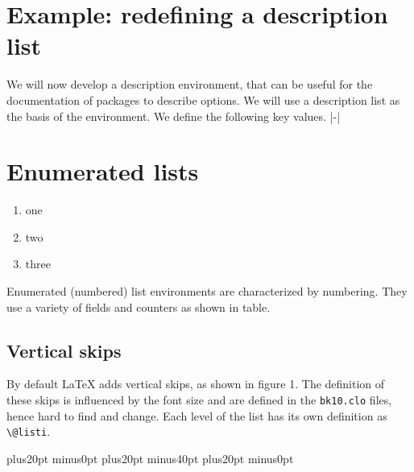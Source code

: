 \section{Example: redefining a description list}
We will now develop a description environment, that can be useful for the documentation of packages to describe options. We will use a description list as the basis of the environment. We define the following key values.
|\itemindent-\leftmargin|

\section{Enumerated lists}


\begin{enumerate}
\item one
\item two
\item three
\end{enumerate}

Enumerated (numbered) list environments are characterized by numbering. They use a variety of fields and counters as shown in table.

\subsection{Vertical skips}

By default LaTeX adds vertical skips, as shown in figure 1. The definition of these skips is influenced by the font size and are defined in the \texttt{bk10.clo} files, hence hard to find and change. Each level of the list has its own definition as \lstinline{\@listi}.

\bigskip
{}

\begin{teXXX}
\def\@listi{\leftmargin\leftmargini
            \parsep 40pt plus20pt minus0pt
            \topsep 80pt plus20pt minus40pt
            \itemsep40pt plus20pt minus0pt}
\let\@listI\@listi
\@listi

\def\@listii {\leftmargin\leftmarginii
              \labelwidth\leftmarginii
              \advance\labelwidth-\labelsep
              \topsep    40pt plus20pt minus0pt
              \parsep    20pt plus0pt  minus0pt
              \itemsep   \parsep}
\def\@listiii{\leftmargin\leftmarginiii
              \labelwidth\leftmarginiii
              \advance\labelwidth-\labelsep
              \topsep    20pt plus0ptminus0pt
              \parsep    1pt
              \partopsep 0pt plus\z@ minus0pt
              \itemsep   \topsep}
\def\@listiv {\leftmargin\leftmarginiv
              \labelwidth\leftmarginiv
              \advance\labelwidth-\labelsep}
\def\@listv  {\leftmargin\leftmarginv
              \labelwidth\leftmarginv
              \advance\labelwidth-\labelsep}
\def\@listvi {\leftmargin\leftmarginvi
              \labelwidth\leftmarginvi
              \advance\labelwidth-\labelsep}
\end{teXXX}


